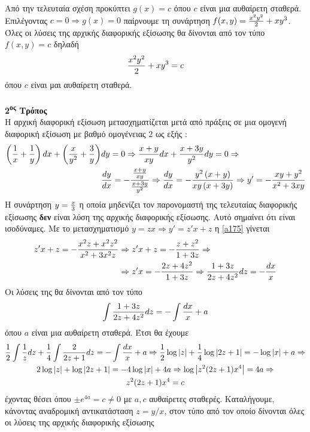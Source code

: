 \documentclass[a4paper,twoside,11pt]{book}
\DeclareRobustCommand{\frac}[3][0pt]{%
{\begingroup\hspace{#1}#2\hspace{#1}\endgroup\over\hspace{#1}#3\hspace{#1}}}
\newcommand{\tss}[1]{\textsuperscript{#1}}
\begin{document}
Από την τελευταία σχέση προκύπτει $ g(x)=c $ όπου $ c $ είναι μια αυθαίρετη σταθερά. Επιλέγοντας $ c=0\Rightarrow g(x)=0 $ παίρνουμε τη συνάρτηση $ f(x,y)=\frac{x^2y^2}{2}+xy^3 $. Όλες οι λύσεις της αρχικής διαφορικής εξίσωσης θα δίνονται από τον τύπο $ f(x,y)=c $ δηλαδή
\[ \frac{x^2y^2}{2}+xy^3=c \] όπου $ c $ είναι μαι αυθαίρετη σταθερά.\\\\
\textbf{2\tss{ος} Τρόπος}\\
Η αρχική διαφορική εξίσωση μετασχηματίζεται μετά από πράξεις σε μια ομογενή διαφορική εξίσωση με βαθμό ομογένειας $ 2 $ ως εξής :
\begin{align}
\left(\frac{1}{x}+\frac{1}{y} \right)dx+\left(\frac{x}{y^2}+\frac{3}{y} \right)&dy=0\Rightarrow\frac{x+y}{xy}dx+\frac{x+3y}{y^2}dy=0\Rightarrow\nonumber\\\label{a175}
&\frac{dy}{dx}=-\dfrac{\frac{x+y}{xy}}{\frac{x+3y}{y^2}}\Rightarrow\frac{dy}{dx}=-\dfrac{y^2\left(x+y\right)}{xy\left( x+3y\right)}\Rightarrow y'=-\dfrac{xy+y^2}{x^2+3xy}
\end{align}
Η συνάρτηση $ y=\frac{x}{3} $ η οποία μηδενίζει τον παρονομαστή της τελευταίας διαφορικής εξίσωσης \textbf{δεν} είναι λύση της αρχικής διαφορικής εξίσωσης. Αυτό σημαίνει ότι είναι ισοδύναμες. Με το μετασχηματισμό $ y=zx\Rightarrow y'=z'x+z $ η \eqref{a175} γίνεται
\begin{align*}
z'x+z=-\dfrac{x^2z+x^2z^2}{x^2+3x^2z}&\Rightarrow z'x+z=-\dfrac{z+z^2}{1+3z}\Rightarrow\\ &\Rightarrow z'x=-\dfrac{2z+4z^2}{1+3z}\Rightarrow \dfrac{1+3z}{2z+4z^2}dz=-\frac{dx}{x}
\end{align*}
Οι λύσεις της θα δίνονται από τον τύπο
\begin{gather*}
\int\dfrac{1+3z}{2z+4z^2}dz=-\int\frac{dx}{x}+a
\end{gather*}
όπου $ a $ είναι μια αυθαίρετη σταθερά. Έτσι θα έχουμε
\begin{gather*}
\frac{1}{2}\int\dfrac{1}{z}dz+\frac{1}{4}\int\frac{2}{2z+1}dz=-\int\frac{dx}{x}+a\Rightarrow \frac{1}{2}\log{|z|}+\frac{1}{4}\log{|2z+1|}=-\log{|x|}+a\Rightarrow\\
2\log{|z|}+\log{|2z+1|}=-4\log{|x|}+4a\Rightarrow \log{\left|z^2(2z+1)x^4 \right| }=4a\Rightarrow\\
z^2(2z+1)x^4 =c
\end{gather*}
έχοντας θέσει όπου $ \pm e^{4a}=c\neq0 $ με $ a,c $ αυθαίρετες σταθερές. Καταλήγουμε, κάνοντας αναδρομική αντικατάσταση $ z=y/x $, στον τύπο από τον οποίο δίνονται όλες οι λύσεις της αρχικής διαφορικής εξίσωσης
\end{document}

